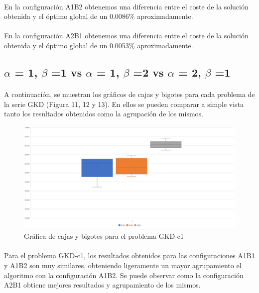 	\paragraph{}En la configuración A1B2 obtenemos una diferencia entre el coste de la solución obtenida y el óptimo global de un 0.0086\% aproximadamente.
	
	\paragraph{}En la configuración A2B1 obtenemos una diferencia entre el coste de la solución obtenida y el óptimo global de un 0.0053\% aproximadamente.
	
	\subsection{$\alpha$ = 1, $\beta$ =1 vs $\alpha$ = 1, $\beta$ =2 vs $\alpha$ = 2, $\beta$ =1}
	
	\paragraph{}A continuación, se muestran los gráficos de cajas y bigotes para cada problema de la serie GKD (Figura 11, 12 y 13). En ellos se pueden comparar a simple vista tanto los resultados obtenidos como la agrupación de los mismos.
	
	\begin{figure}[H]
		\centering
		\includegraphics[scale=0.3]{img/BIGOTESGKD1.png}
		\caption{Gráfica de cajas y bigotes para el problema GKD-c1}
		\label{gkd-c1_bigotes}
	\end{figure}

	\paragraph{}Para el problema GKD-c1, los resultados obtenidos para las configuraciones A1B1 y A1B2 son muy similares, obteniendo ligeramente un mayor agrupamiento el algoritmo con la configuración A1B2. Se puede observar como la configuración A2B1 obtiene mejores resultados y agrupamiento de los mismos.

